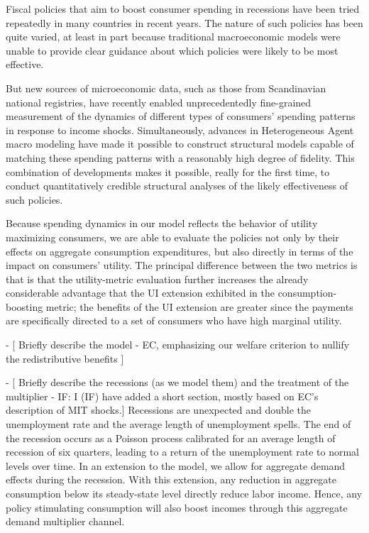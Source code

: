 \documentclass[../HAFiscal]{subfiles}
\begin{document}
Fiscal policies that aim to boost consumer spending in recessions have been tried repeatedly in many countries in recent years.  The nature of such policies has been quite varied, at least in part because traditional macroeconomic models were unable to provide clear guidance about which policies were likely to be most effective.

But new sources of microeconomic data, such as those from Scandinavian national registries, have recently enabled unprecedentedly fine-grained measurement of the dynamics of different types of consumers' spending patterns in response to income shocks.  Simultaneously, advances in Heterogeneous Agent macro modeling have made it possible to construct structural models capable of matching these spending patterns with a reasonably high degree of fidelity.  This combination of developments makes it possible, really for the first time, to conduct quantitatively credible structural analyses of the likely effectiveness of such policies.

Because spending dynamics in our model reflects the behavior of utility maximizing consumers, we are able to evaluate the policies not only by their effects on aggregate consumption expenditures, but also directly in terms of the impact on consumers' utility.  The principal difference between the two metrics is that is that the utility-metric evaluation further increases the already considerable advantage that the UI extension exhibited in the consumption-boosting metric; the benefits of the UI extension are greater since the payments are specifically directed to a set of consumers who have high marginal utility.

- [ Briefly describe the model - EC, emphasizing our welfare criterion to nullify the redistributive benefits ]

- [ Briefly describe the recessions (as we model them) and the treatment of the multiplier - IF: I (IF) have added a short section, mostly based on EC's description of MIT shocks.]
Recessions are unexpected and double the unemployment rate
and the average length of unemployment spells. The end of the recession occurs as a Poisson process calibrated for an average length of recession of six quarters, leading to a return of the unemployment rate to normal levels over time. In an extension to the model, we allow for aggregate demand effects during the recession. With this extension, any reduction in aggregate consumption below its steady-state level directly reduce labor income. Hence, any policy stimulating consumption will also boost incomes through this aggregate demand multiplier channel.
\end{document}
